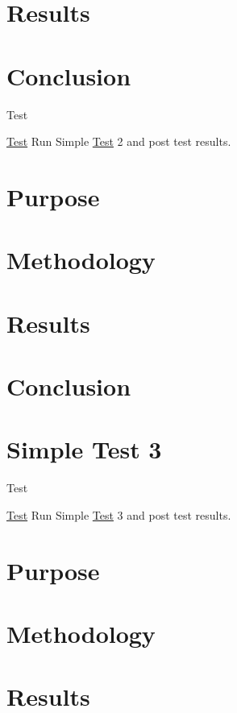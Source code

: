 \section*{Results}

\section*{Conclusion}

\begin{DoxyRefDesc}{Test}
\item[\hyperlink{test__test000015}{Test}]Run Simple \hyperlink{class_test}{Test} 2 and post test results.\end{DoxyRefDesc}


\section*{Purpose}

\section*{Methodology}

\section*{Results}

\section*{Conclusion}\hypertarget{SimpleTest3}{}\section{Simple Test 3}\label{SimpleTest3}
\begin{DoxyRefDesc}{Test}
\item[\hyperlink{test__test000007}{Test}]Run Simple \hyperlink{class_test}{Test} 3 and post test results.\end{DoxyRefDesc}


\section*{Purpose}

\section*{Methodology}

\section*{Results}

